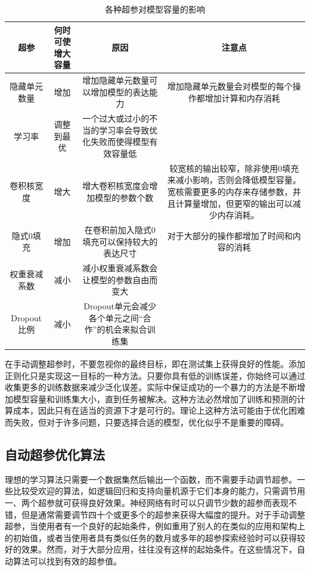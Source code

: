 \begin{table}[!hbp]
    \begin{tabular}{|c|c|c|c|}
        \hline
        \hline
        超参 & 何时可使增大容量 & 原因 & 注意点 \\
        \hline
        隐藏单元数量 & 增加 & 增加隐藏单元数量可以增加模型的表达能力 & 增加隐藏单元数量会对模型的每个操作都增加计算和内存消耗 \\
        \hline
        学习率 & 调整到最优 & 一个过大或过小的不当的学习率会导致优化失败而使得模型有效容量低 & \\
        \hline
        卷积核宽度 & 增大 & 增大卷积核宽度会增加模型的参数个数 & 较宽核的输出较窄，除非使用0填充来减小影响，否则会降低模型容量。宽核需要更多的内存来存储参数，并且计算量增加，但更窄的输出可以减少内存消耗。 \\
        \hline
        隐式0填充 & 增加 & 在卷积前加入隐式0填充可以保持较大的表达尺寸 & 对于大部分的操作都增加了时间和内容的消耗 \\
        \hline
        权重衰减系数 & 减小 & 减小权重衰减系数会让模型的参数自由而变大 &  \\
        \hline
        Dropout比例 & 减小 & Dropout单元会减少各个单元之间“合作”的机会来拟合训练集 &  \\
        \hline
        \hline
    \end{tabular}
    \caption{各种超参对模型容量的影响}
    \label{tab:11.1}
\end{table}

在手动调整超参时，不要忽视你的最终目标，即在测试集上获得良好的性能。添加正则化只是实现这一目标的一种方法。只要你具有低的训练误差，你始终可以通过收集更多的训练数据来减少泛化误差。实际中保证成功的一个暴力的方法是不断增加模型容量和训练集大小，直到任务被解决。这种方法必然增加了训练和预测的计算成本，因此只有在适当的资源下才是可行的。理论上这种方法可能由于优化困难而失败，但对于许多问题，只要选择合适的模型，优化似乎不是重要的障碍。

\subsection{自动超参优化算法}
\label{sec:11.4.2}

理想的学习算法只需要一个数据集然后输出一个函数，而不需要手动调节超参。一些比较受欢迎的算法，如逻辑回归和支持向量机源于它们本身的能力，只需调节用一、两个超参就可获得良好效果。神经网络有时可以只调节少数的超参而表现不错，但是通常需要调节四十个或更多个的超参来获得大幅度的提升。对于手动调整超参，当使用者有一个良好的起始条件，例如重用了别人的在类似的应用和架构上的初始值，或者当使用者具有类似任务的数月或多年的超参探索经验时可以获得较好的效果。然而，对于大部分应用，往往没有这样的起始条件。在这些情况下，自动算法可以找到有效的超参值。

